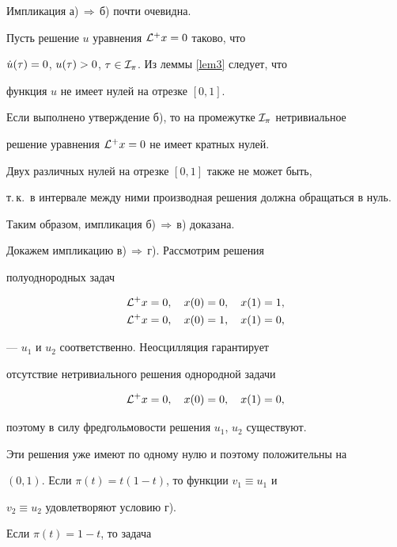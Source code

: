 \begin{pf} Импликация а)\,$\Rightarrow$\,б) почти очевидна.


Пусть решение $u$ уравнения ${\cal L}^+x=0$ таково, что


$\Dot u(\tau)=0$, $u(\tau)>0$, $\tau\in{\cal I}_\pi$. Из леммы \ref{lem3} следует, что


функция $u$ не имеет нулей на отрезке $[0,1]$.





Если выполнено утверждение б), то на промежутке ${\cal I}_\pi$ нетривиальное


решение уравнения ${\cal L}^+x=0$ не имеет кратных нулей.


Двух различных нулей на отрезке $[0,1]$ также не может быть,


т.\,к.~в интервале между ними производная решения должна обращаться в нуль.


Таким образом, импликация б)\,$\Rightarrow$\,в) доказана.





Докажем импликацию в)\,$\Rightarrow$\,г). Рассмотрим решения


полуоднородных задач


\begin{gather*}


\L^+x=0,\quad x(0)=0,\q x(1)=1,\\


\L^+x=0,\quad x(0)=1,\q x(1)=0,


\end{gather*}


--- $u_1$ и $u_2$ соответственно. Неосцилляция гарантирует


отсутствие нетривиального решения однородной задачи


$$


\L^+x=0,\quad x(0)=0,\q x(1)=0,


$$


поэтому в силу фредгольмовости решения $u_1$, $u_2$ существуют.


Эти решения уже имеют по одному нулю и поэтому положительны на


$(0,1)$. Если $\pi(t)=t(1-t)$, то функции $v_1\equiv u_1$ и


$v_2\equiv u_2$ удовлетворяют условию г).





Если $\pi(t)=1-t$, то задача


$$



\end{pf}
